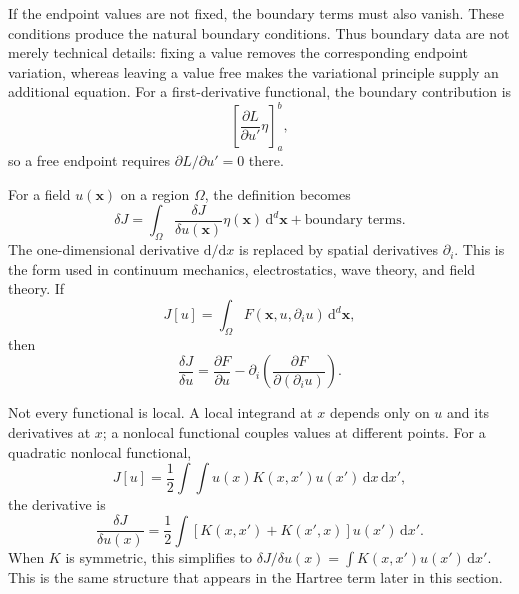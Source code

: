 If the endpoint values are not fixed, the boundary terms must also vanish. These conditions produce the natural boundary conditions. Thus boundary data are not merely technical details: fixing a value removes the corresponding endpoint variation, whereas leaving a value free makes the variational principle supply an additional equation. For a first-derivative functional, the boundary contribution is
\begin{equation}
\left[\frac{\partial L}{\partial u'}\eta\right]_a^b,
\end{equation}
so a free endpoint requires $\partial L/\partial u'=0$ there.

For a field $u(\mathbf{x})$ on a region $\Omega$, the definition becomes
\begin{equation}
\delta J=\int_\Omega\frac{\delta J}{\delta u(\mathbf{x})}
\eta(\mathbf{x})\,\mathrm{d}^d\mathbf{x}
+\text{boundary terms}.
\end{equation}
The one-dimensional derivative $\mathrm{d}/\mathrm{d}x$ is replaced by spatial derivatives $\partial_i$. This is the form used in continuum mechanics, electrostatics, wave theory, and field theory. If
\begin{equation}
J[u]=\int_\Omega F(\mathbf{x},u,\partial_i u)\,\mathrm{d}^d\mathbf{x},
\end{equation}
then
\begin{equation}
\frac{\delta J}{\delta u}
=\frac{\partial F}{\partial u}
-\partial_i\left(\frac{\partial F}{\partial(\partial_i u)}\right).
\end{equation}

Not every functional is local. A local integrand at $x$ depends only on $u$ and its derivatives at $x$; a nonlocal functional couples values at different points. For a quadratic nonlocal functional,
\begin{equation}
J[u]=\frac12\int\!\int u(x)K(x,x')u(x')\,\mathrm{d}x\,\mathrm{d}x',
\end{equation}
the derivative is
\begin{equation}
\frac{\delta J}{\delta u(x)}
=\frac12\int\left[K(x,x')+K(x',x)\right]u(x')\,\mathrm{d}x'.
\end{equation}
When $K$ is symmetric, this simplifies to $\delta J/\delta u(x)=\int K(x,x')u(x')\,\mathrm{d}x'$. This is the same structure that appears in the Hartree term later in this section.

